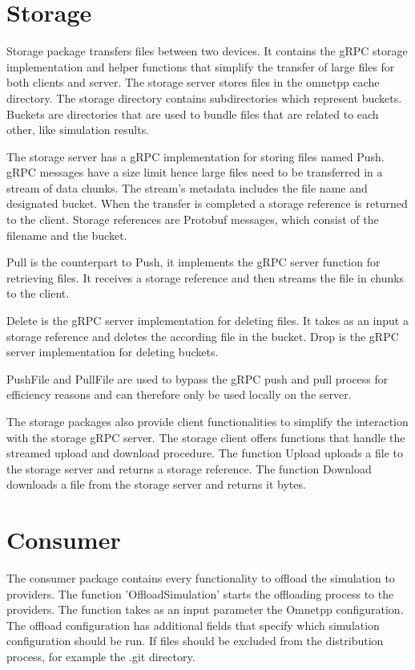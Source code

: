 \section{Storage}
Storage package transfers files between two devices. It contains the gRPC storage implementation and helper functions that simplify the transfer of large files for both clients and server. The storage server stores files in the omnetpp cache directory. The storage directory contains subdirectories which represent buckets. Buckets are directories that are used to bundle files that are related to each other, like simulation results.

The storage server has a gRPC implementation for storing files named Push. gRPC messages have a size limit hence large files need to be transferred in a stream of data chunks. The stream's metadata includes the file name and designated bucket. When the transfer is completed a storage reference is returned to the client. Storage references are Protobuf messages, which consist of the filename and the bucket.

Pull is the counterpart to Push, it implements the gRPC server function for retrieving files. It receives a storage reference and then streams the file in chunks to the client.

Delete is the gRPC server implementation for deleting files. It takes as an input a storage reference and deletes the according file in the bucket. Drop is the gRPC server implementation for deleting buckets. 

PushFile and PullFile are used to bypass the gRPC push and pull process for efficiency reasons and can therefore only be used locally on the server.

The storage packages also provide client functionalities to simplify the interaction with the storage gRPC server. The storage client offers functions that handle the streamed upload and download procedure. The function Upload uploads a file to the storage server and returns a storage reference. The function Download downloads a file from the storage server and returns it bytes.

\section{Consumer}
The consumer package contains every functionality to offload the simulation to providers. The function 'OffloadSimulation' starts the offloading process to the providers. The function takes as an input parameter the Omnetpp configuration. The offload configuration has additional fields that specify which simulation configuration should be run. If files should be excluded from the distribution process, for example the .git directory.

